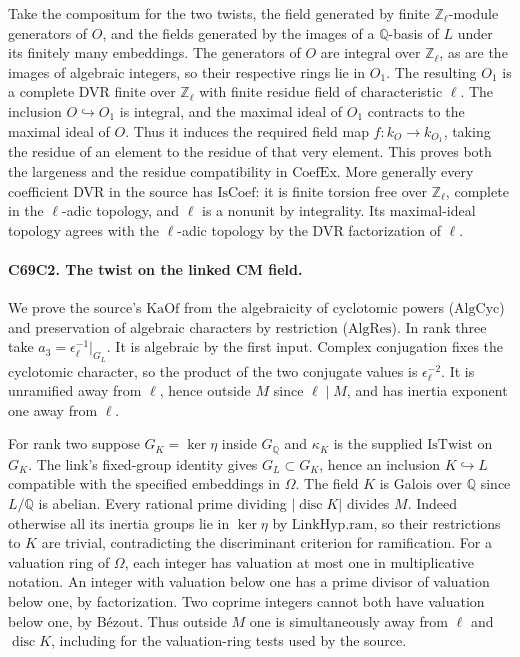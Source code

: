 Take the compositum for the two twists, the field generated by finite
$\mathbb Z_\ell$-module generators of $O$, and the fields generated
by the images of a $\mathbb Q$-basis of $L$ under its finitely many
embeddings. The generators of $O$ are integral over $\mathbb Z_\ell$,
as are the images of algebraic integers, so their respective rings
lie in $O_1$. The resulting $O_1$ is a complete DVR finite over
$\mathbb Z_\ell$ with finite residue field of characteristic $\ell$.
The inclusion $O\hookrightarrow O_1$ is integral, and the maximal
ideal of $O_1$ contracts to the maximal ideal of $O$. Thus it induces
the required field map $f:k_O\to k_{O_1}$, taking the residue of an
element to the residue of that very element. This proves both the
largeness and the residue compatibility in $\mathrm{CoefEx}$.
More generally every coefficient DVR in the source has
$\mathrm{IsCoef}$: it is finite torsion free over $\mathbb Z_\ell$,
complete in the $\ell$-adic topology, and $\ell$ is a nonunit by
integrality. Its maximal-ideal topology agrees with the $\ell$-adic
topology by the DVR factorization of $\ell$.

\paragraph{C69C2. The twist on the linked CM field.}
We prove the source's $\mathrm{KaOf}$ from the algebraicity of
cyclotomic powers ($\mathrm{AlgCyc}$) and preservation of algebraic
characters by restriction ($\mathrm{AlgRes}$). In rank three take
$a_3=\epsilon_\ell^{-1}|_{G_L}$. It is algebraic by the first input.
Complex conjugation fixes the cyclotomic character, so the product
of the two conjugate values is $\epsilon_\ell^{-2}$. It is unramified
away from $\ell$, hence outside $M$ since $\ell\mid M$, and has
inertia exponent one away from $\ell$.

For rank two suppose $G_K=\ker\eta$ inside $G_{\mathbb Q}$ and
$\kappa_K$ is the supplied $\mathrm{IsTwist}$ on $G_K$. The link's
fixed-group identity gives $G_L\subset G_K$, hence an inclusion
$K\hookrightarrow L$ compatible with the specified embeddings in
$\Omega$. The field $K$ is Galois over $\mathbb Q$ since $L/\mathbb Q$
is abelian. Every rational prime dividing $|\operatorname{disc}K|$
divides $M$. Indeed otherwise all its inertia groups lie in
$\ker\eta$ by $\mathrm{LinkHyp.ram}$, so their restrictions to $K$
are trivial, contradicting the discriminant criterion for ramification.
For a valuation ring of $\Omega$, each integer has valuation at most
one in multiplicative notation. An integer with valuation below one
has a prime divisor of valuation below one, by factorization. Two
coprime integers cannot both have valuation below one, by B\'ezout.
Thus outside $M$ one is simultaneously away from $\ell$ and
$\operatorname{disc}K$, including for the valuation-ring tests used
by the source.

